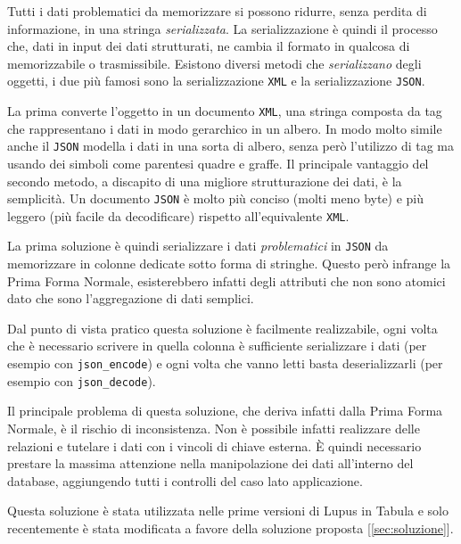 Tutti i dati problematici da memorizzare si possono ridurre, senza perdita di informazione, in una stringa \emph{serializzata}. La serializzazione è quindi il processo che, dati in input dei dati strutturati, ne cambia il formato in qualcosa di memorizzabile o trasmissibile. Esistono diversi metodi che \emph{serializzano} degli oggetti, i due più famosi sono la serializzazione \texttt{XML} e la serializzazione \texttt{JSON}. 

La prima converte l'oggetto in un documento \texttt{XML}, una stringa composta da tag che rappresentano i dati in modo gerarchico in un albero. In modo molto simile anche il \texttt{JSON} modella i dati in una sorta di albero, senza però l'utilizzo di tag ma usando dei simboli come parentesi quadre e graffe. Il principale vantaggio del secondo metodo, a discapito di una migliore strutturazione dei dati, è la semplicità. Un documento \texttt{JSON} è molto più conciso (molti meno byte) e più leggero (più facile da decodificare) rispetto all'equivalente \texttt{XML}.

La prima soluzione è quindi serializzare i dati \emph{problematici} in \texttt{JSON} da memorizzare in colonne dedicate sotto forma di stringhe. Questo però infrange la Prima Forma Normale, esisterebbero infatti degli attributi che non sono atomici dato che sono l'aggregazione di dati semplici.

Dal punto di vista pratico questa soluzione è facilmente realizzabile, ogni volta che è necessario scrivere in quella colonna è sufficiente serializzare i dati (per esempio con \texttt{json\_encode}) e ogni volta che vanno letti basta deserializzarli (per esempio con \texttt{json\_decode}).

Il principale problema di questa soluzione, che deriva infatti dalla Prima Forma Normale, è il rischio di inconsistenza. Non è possibile infatti realizzare delle relazioni e tutelare i dati con i vincoli di chiave esterna. È quindi necessario prestare la massima attenzione nella manipolazione dei dati all'interno del database, aggiungendo tutti i controlli del caso lato applicazione.

Questa soluzione è stata utilizzata nelle prime versioni di Lupus in Tabula e solo recentemente è stata modificata a favore della soluzione proposta [\ref{sec:soluzione}].